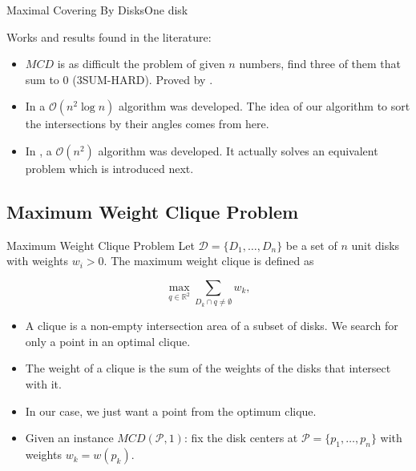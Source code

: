 \documentclass{beamer}
\newcommand{\R}{\mathbb{R}}
\newcommand{\D}{\mathscr{D}}
\newcommand{\Pp}{\mathscr{P}}
\newcommand{\bigO}{\mathscr{O}}
\begin{document}
\begin{frame}{Maximal Covering By Disks}{One disk}
	
	Works and results found in the literature:
	
	\begin{itemize}
		\item $MCD$ is as difficult the problem of given $n$ numbers, find three of them that sum to $0$ (3SUM-HARD). Proved by \autocite{aronov:2008}.
		
		\item In \autocite{drezner} a $\bigO(n^2\log{n})$ algorithm was developed. The idea of our algorithm to sort the intersections by their angles comes from here.
		
		\item In \autocite{chazelle:1986}, a $\bigO(n^2)$ algorithm was developed. It actually solves an equivalent problem which is introduced next.
	\end{itemize}
	
	
	
\end{frame}

\subsection{Maximum Weight Clique Problem}
\begin{frame}{Maximum Weight Clique Problem}
	Let $\D=\{D_1,\dots,D_n\}$ be a set of $n$ unit disks with weights $w_i>0$. The maximum weight clique is defined as
	
	\begin{equation*}
	\max_{q\in\R^2} \sum_{D_k \cap q \neq \emptyset} w_k,
	\end{equation*}
	
	\begin{itemize}
		\item A clique is a non-empty intersection area of a subset of disks. We search for only a point in an optimal clique.
		
		\item The weight of a clique is the sum of the weights of the disks that intersect with it.
		
		\item In our case, we just want a point from the optimum clique.
		
		\item Given an instance $MCD(\Pp, 1)$: fix the disk centers at $\Pp =\{p_1,\dots,p_n\}$ with weights $w_k=w(p_k)$.

	\end{itemize}
\end{frame}
\end{document}
